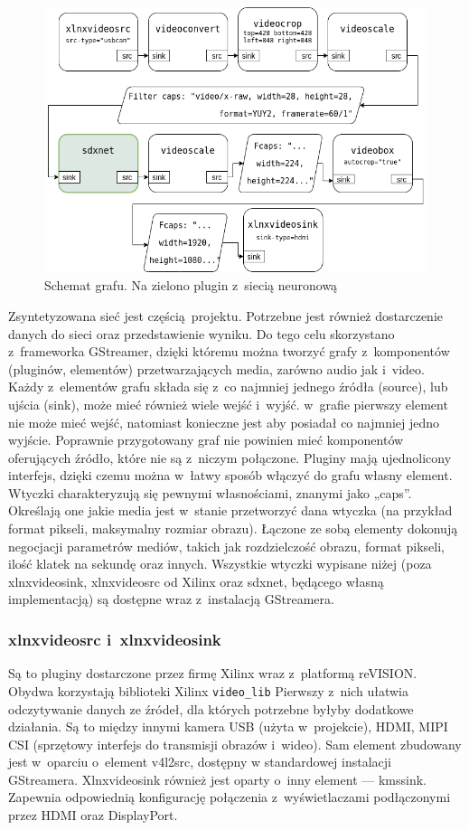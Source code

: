 \documentclass[12pt, oneside, a4paper]{article}
\begin{document}
\begin{figure}[h]
  \centering
  \includegraphics[width=0.9\linewidth]{figures/pipeline.png}
  \caption{Schemat grafu. Na zielono plugin z~siecią neuronową}\label{fig:pipeline}
\end{figure}
Zsyntetyzowana sieć jest częścią projektu. Potrzebne jest również dostarczenie
danych do sieci oraz przedstawienie wyniku.
Do tego celu skorzystano z~frameworka GStreamer, dzięki któremu można
tworzyć grafy z~komponentów (pluginów, elementów)
przetwarzających media, zarówno audio jak i~video.
Każdy z~elementów grafu składa się z~co najmniej jednego źródła (source),
lub ujścia (sink), może mieć również wiele wejść i~wyjść. w~grafie pierwszy
element nie może mieć wejść, natomiast konieczne jest aby posiadał co najmniej
jedno wyjście. Poprawnie przygotowany graf nie powinien mieć komponentów
oferujących źródło, które nie są z~niczym połączone.
Pluginy mają ujednolicony interfejs, dzięki czemu można w~łatwy sposób
włączyć do grafu własny element. Wtyczki charakteryzują się
pewnymi własnościami, znanymi jako „caps”. Określają one jakie 
media jest w~stanie przetworzyć dana wtyczka (na przykład format pikseli,
maksymalny rozmiar obrazu). 
Łączone ze sobą elementy dokonują negocjacji
parametrów mediów, takich jak rozdzielczość obrazu, format pikseli,
ilość klatek na sekundę oraz innych. Wszystkie wtyczki wypisane niżej
(poza xlnxvideosink, xlnxvideosrc od Xilinx oraz sdxnet, będącego
własną implementacją) są dostępne wraz z~instalacją GStreamera.

\subsubsection{xlnxvideosrc i~xlnxvideosink}\label{sec:xlnxvideosrc i~xlnxvideosink}
Są to pluginy dostarczone przez firmę Xilinx wraz z~platformą reVISION.
Obydwa korzystają biblioteki Xilinx \lstinline{video_lib}
Pierwszy z~nich ułatwia odczytywanie danych ze źródeł, dla których potrzebne
byłyby dodatkowe działania. Są to między innymi kamera USB (użyta w~projekcie),
HDMI, MIPI CSI (sprzętowy interfejs do transmisji obrazów i~wideo).
Sam element zbudowany jest w~oparciu o~element v4l2src, dostępny
w standardowej instalacji GStreamera.
Xlnxvideosink również jest oparty o~inny element --- kmssink.
Zapewnia odpowiednią konfigurację połączenia z~wyświetlaczami
podłączonymi przez HDMI oraz DisplayPort.
\end{document}
